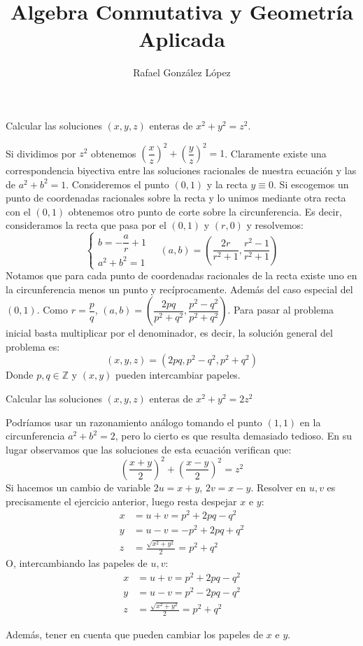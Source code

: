 \documentclass[twoside]{article}
\begin{document}
\title{Algebra Conmutativa y Geometría Aplicada}
\author{Rafael González López}
\maketitle

\begin{ejercicio}{1}
Calcular las soluciones $(x,y,z)$ enteras de $x^2+y^2=z^2$.
\begin{solucion}
Si dividimos por $z^2$ obtenemos $\left(\dfrac{x}{z}\right)^2+\left(\dfrac{y}{z}\right)^2=1$. Claramente existe una correspondencia biyectiva entre las soluciones racionales de nuestra ecuación y las de $a^2+b^2=1$. Consideremos el punto $(0,1)$ y la recta $y\equiv 0$. Si escogemos un punto de coordenadas racionales sobre la recta y lo unimos mediante otra recta con el $(0,1)$ obtenemos otro punto de corte sobre la circunferencia. Es decir, consideramos la recta que pasa por el $(0,1)$ y $(r,0)$ y resolvemos:
\[\begin{cases}
b=-\dfrac{a}{r}+1\\
a^2+b^2=1
\end{cases} \quad (a,b) = \left(\dfrac{2r}{r^2+1},\frac{r^2-1}{r^2+1}\right)
\]
Notamos que para cada punto de coordenadas racionales de la recta existe uno en la circunferencia menos un punto y recíprocamente. Además del caso especial del $(0,1)$. Como $r=\dfrac{p}{q}$, $(a,b)=\left(\dfrac{2pq}{p^2+q^2},\dfrac{p^2-q^2}{p^2+q^2}\right)$. Para pasar al problema inicial basta multiplicar por el denominador, es decir, la solución general del problema es:
\[(x,y,z)= \left(2pq,{p^2-q^2},{p^2+q^2}\right)\]
Donde $p,q\in\mathbb{Z}$ y $(x,y)$ pueden intercambiar papeles.
\end{solucion}
\end{ejercicio}
\newpage
\begin{ejercicio}{2}
Calcular las soluciones $(x,y,z)$ enteras de $x^2+y^2=2z^2$
\begin{solucion}
Podríamos usar un razonamiento análogo tomando el punto $(1,1)$ en la circunferencia $a^2+b^2=2$, pero lo cierto es que resulta demasiado tedioso. En su lugar observamos que las soluciones de esta ecuación verifican que:
\[
\left(\frac{x+y}{2}\right)^2+\left(\frac{x-y}{2}\right)^2=z^2
\]
Si hacemos un cambio de variable $2u=x+y$, $2v = x-y$. Resolver en $u,v$ es precisamente el ejercicio anterior, luego resta despejar $x$ e $y$:
\begin{align*}
x &= u + v = p^2+2pq -q^2\\
y &= u - v = - p^2+ 2pq +q^2\\
z &= \frac{\sqrt{x^2+y^2}}{2} =  p^2+q^2
\end{align*}
O, intercambiando las papeles de $u,v$: 
\begin{align*}
x &= u + v = p^2+2pq -q^2\\
y &= u - v =  p^2-2pq -q^2\\
z &= \frac{\sqrt{x^2+y^2}}{2} =  p^2+q^2
\end{align*}
\end{solucion}
Además, tener en cuenta que pueden cambiar los papeles de $x$ e $y$.
\end{ejercicio}
\end{document}

